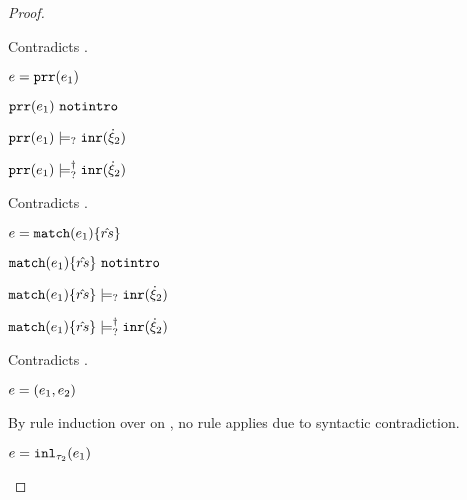 \begin{proof}
\begin{byCases}
\begin{byCases}
        Contradicts .
        \item[\text{(\ref{rule:IPrr})}]
        \begin{pfsteps*}
        \item $e=\mathtt{prr}(e_1)$ 
        \item $\mathtt{prr}(e_1) ~\mathtt{notintro}$  
        \item $\mathtt{prr}(e_1) \models_{?} \mathtt{inr}(\dot{\xi}_2)$  
        \item $\mathtt{prr}(e_1) \models_{?}^{\dag} \mathtt{inr}(\dot{\xi}_2)$ 
        \end{pfsteps*} 
        Contradicts .
        \item[\text{(\ref{rule:IMatch})}]
        \begin{pfsteps*}
        \item $e=\mathtt{match}(e_1) \{\hat{rs}\}$ 
        \item $\mathtt{match}(e_1) \{\hat{rs}\} ~\mathtt{notintro}$  
        \item $\mathtt{match}(e_1) \{\hat{rs}\} \models_{?} \mathtt{inr}(\dot{\xi}_2)$  
        \item $\mathtt{match}(e_1) \{\hat{rs}\} \models_{?}^{\dag} \mathtt{inr}(\dot{\xi}_2)$ 
        \end{pfsteps*} 
        Contradicts .
        \item[\text{(\ref{rule:IPairL}), (\ref{rule:IPairR}), (\ref{rule:IPair})}] 
        \begin{pfsteps*}
        \item $e=(e_1 , e_2)$ 
        \end{pfsteps*} 
        By rule induction over  on , no rule applies due to syntactic contradiction.
        \item[\text{(\ref{rule:IInl})}] 
        \begin{pfsteps*}
        \item $e=\mathtt{inl}_{\tau_2}({e_1})$ 
        \end{pfsteps*}

\end{byCases}
\end{byCases}
\end{proof}
